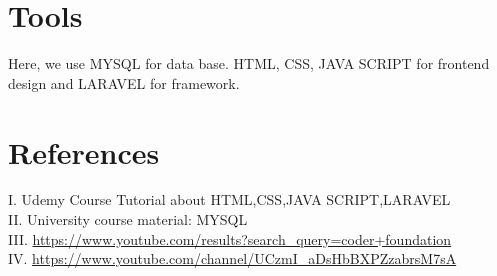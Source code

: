 \documentclass{article}
\begin{document}
\begin{titlepage}
\begin{figure}[h!]
\end{figure}

\vspace{10cm}

\section{Tools}\label{oject}

Here, we use MYSQL for data base. HTML, CSS, JAVA SCRIPT for frontend design and LARAVEL for framework.


\section{References}\label{oject}
I.	Udemy Course Tutorial about HTML,CSS,JAVA SCRIPT,LARAVEL \\
II.	University course material: MYSQL \\
III. \url{https://www.youtube.com/results?search_query=coder+foundation} \\
IV. \url{https://www.youtube.com/channel/UCzmI_aDsHbBXPZzabrsM7sA}



\end{titlepage}
\end{document}

